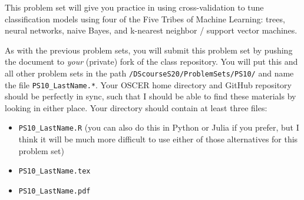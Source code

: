 \documentclass[12pt,english]{exam}
\begin{document}
This problem set will give you practice in using cross-validation to tune classification models using four of the Five Tribes of Machine Learning: trees, neural networks, naive Bayes, and k-nearest neighbor / support vector machines.

As with the previous problem sets, you will submit this problem set by pushing the document to \emph{your} (private) fork of the class repository. You will put this and all other problem sets in the path \texttt{/DScourseS20/ProblemSets/PS10/} and name the file \texttt{PS10\_LastName.*}. Your OSCER home directory and GitHub repository should be perfectly in sync, such that I should be able to find these materials by looking in either place. Your directory should contain at least three files:
\begin{itemize}
    \item \texttt{PS10\_LastName.R} (you can also do this in Python or Julia if you prefer, but I think it will be much more difficult to use either of those alternatives for this problem set)
    \item \texttt{PS10\_LastName.tex}
    \item \texttt{PS10\_LastName.pdf}
\end{itemize}
\end{document}
